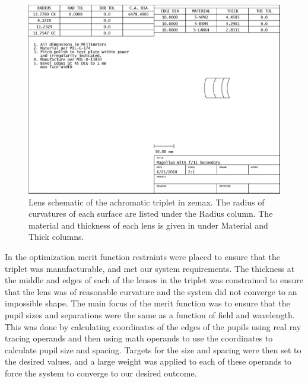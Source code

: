 \begin{figure}[h]
	\centering
	\includegraphics[width=.8\textwidth]{Chapter Materials/Chapter Three Materials/cameralenstripletSPEC.jpg}
	\caption{Lens schematic of the achromatic triplet in zemax. The radius of curvatures of each surface are listed under the Radius column. The material and thickness of each lens is given in under Material and Thick columns.  }
	\label{fig:triplet}
\end{figure}


In the optimization merit function restraints were placed to ensure that the triplet was manufacturable, and met our system requirements. The thickness at the middle and edges of each of the lenses in the triplet was constrained to ensure that the lens was of reasonable curvature and the system did not converge to an impossible shape. The main focus of the merit function was to ensure that the pupil sizes and separations were the same as a function of field and wavelength. This was done by calculating coordinates of the edges of the pupils using real ray tracing operands and then using math operands to use the coordinates to calculate pupil size and spacing. Targets for the size and spacing were then set to the desired values, and a large weight was applied to each of these operands to force the system to converge to our desired outcome.


	
